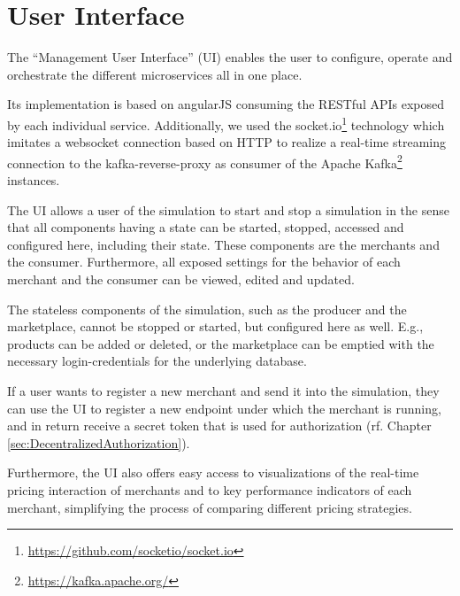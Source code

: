 \section{User Interface}
\label{sec:ui}
%
The ``Management User Interface'' (UI) enables the user to configure, operate and orchestrate the different microservices all in one place. 

Its implementation is based on angularJS consuming the RESTful APIs exposed by each individual service. Additionally, we used the socket.io\footnote{\url{https://github.com/socketio/socket.io}} technology which imitates a websocket connection based on HTTP to realize a real-time streaming connection to the kafka-reverse-proxy as consumer of the Apache Kafka\footnote{\url{https://kafka.apache.org/}} instances.

The UI allows a user of the simulation to start and stop a simulation in the sense that all components having a state can be started, stopped, accessed and configured here, including their state. These components are the merchants and the consumer. Furthermore, all exposed settings for the behavior of each merchant and the consumer can be viewed, edited and updated.

The stateless components of the simulation, such as the producer and the marketplace, cannot be stopped or started, but configured here as well. E.g., products can be added or deleted, or the marketplace can be emptied with the necessary login-credentials for the underlying database.

If a user wants to register a new merchant and send it into the simulation, they can use the UI to register a new endpoint under which the merchant is running, and in return receive a secret token that is used for authorization (rf. Chapter \ref{sec:DecentralizedAuthorization}). 

Furthermore, the UI also offers easy access to visualizations of the real-time pricing interaction of merchants and to key performance indicators of each merchant, simplifying the process of comparing different pricing strategies.